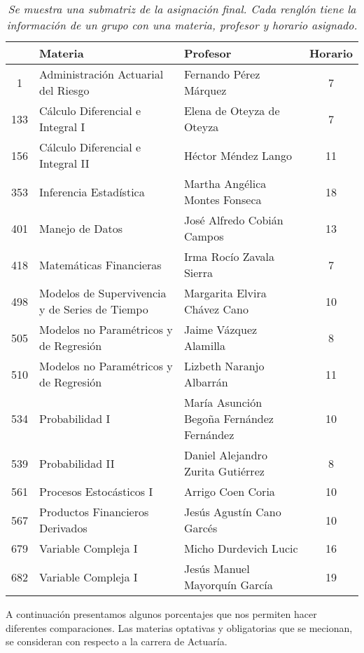\begin{table}[H]
\centering
\begin{tabular}{|c|p{7cm}|p{4.7cm}|c|}
\hline
\textbf{ } & \textbf{Materia} & \textbf{Profesor} & \textbf{Horario} \\ \hline
1 & Administración Actuarial del Riesgo & Fernando Pérez Márquez & 7 \\ \hline
  133 & Cálculo Diferencial e Integral I & Elena de Oteyza de Oteyza & 7 \\ \hline
  156 & Cálculo Diferencial e Integral II & Héctor Méndez Lango & 11 \\ \hline
  353 & Inferencia Estadística & Martha Angélica Montes Fonseca & 18 \\ \hline
  401 & Manejo de Datos & José Alfredo Cobián Campos & 13 \\ \hline
  418 & Matemáticas Financieras & Irma Rocío Zavala Sierra & 7 \\ \hline
  498 & Modelos de Supervivencia y de Series de Tiempo & Margarita Elvira Chávez Cano & 10 \\ \hline
  505 & Modelos no Paramétricos y de Regresión & Jaime Vázquez Alamilla & 8 \\ \hline
  510 & Modelos no Paramétricos y de Regresión & Lizbeth Naranjo Albarrán & 11 \\ \hline
  534 & Probabilidad I & María Asunción Begoña Fernández Fernández & 10 \\ \hline
  539 & Probabilidad II & Daniel Alejandro Zurita Gutiérrez & 8 \\ \hline
  561 & Procesos Estocásticos I & Arrigo Coen Coria & 10 \\ \hline
  567 & Productos Financieros Derivados & Jesús Agustín Cano Garcés & 10 \\ \hline
  679 & Variable Compleja I & Micho Durdevich Lucic & 16 \\ \hline
  682 & Variable Compleja I & Jesús Manuel Mayorquín García & 19 \\ \hline
\end{tabular}
\caption[\textit{Submatriz con asignación final}]{\textit{Se muestra una submatriz de la asignación final. Cada renglón tiene la información de un grupo con una materia, profesor y horario asignado.}}\label{submatAsigFinal}
\end{table}


A continuación presentamos algunos porcentajes que nos permiten hacer diferentes comparaciones. Las materias optativas y obligatorias que se mecionan, se consideran con respecto a la carrera de Actuaría.

